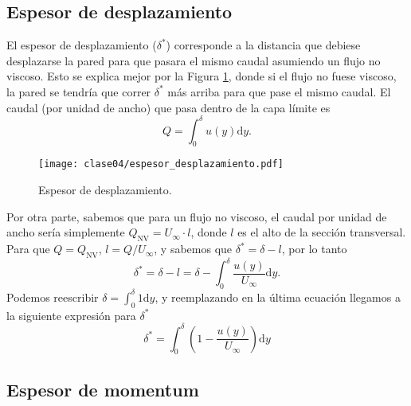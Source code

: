 \subsection*{Espesor de desplazamiento}
El espesor de desplazamiento ($\delta^*$) corresponde a la distancia que debiese desplazarse la pared para que pasara el mismo caudal asumiendo un flujo no viscoso. 
Esto se explica mejor por la Figura \ref{fig:espesor_desplazamiento}, donde si el flujo no fuese viscoso, la pared se tendría que correr $\delta^*$ más arriba para que pase el mismo caudal.
El caudal (por unidad de ancho) que pasa dentro de la capa límite es
%
\begin{equation}
Q = \int_0^\delta u(y)\mathrm{d}y.
\end{equation}

\begin{figure}[!h]
\centering
\texttt{[image: clase04/espesor\_desplazamiento.pdf]}
\caption{Espesor de desplazamiento.}
\label{fig:espesor_desplazamiento}
\end{figure}

Por otra parte, sabemos que para un flujo no viscoso, el caudal por unidad de ancho sería simplemente $Q_\text{NV} = U_\infty \cdot l$, donde $l$ es el alto de la sección transversal.
Para que $Q=Q_\text{NV}$, $l=Q/U_\infty$, y sabemos que $\delta^*=\delta-l$, por lo tanto
%
\begin{equation}
\delta^* = \delta - l = \delta - \int_0^\delta \frac{u(y)}{U_\infty}\mathrm{d}y.
\end{equation}
%
Podemos reescribir $\delta = \int_0^\delta 1\mathrm{d}y$, y reemplazando en la última ecuación llegamos a la siguiente expresión para $\delta^*$
%
\begin{equation}\label{eq:espesor_desplazamiento}
\delta^* = \int_0^\delta \left(1-\frac{u(y)}{U_\infty}\right)\mathrm{d}y
\end{equation}

\subsection*{Espesor de momentum}
